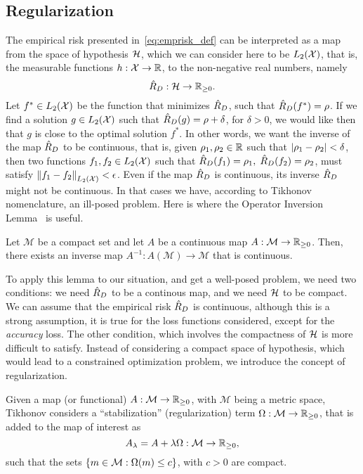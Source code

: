 \subsection{Regularization}
The empirical risk presented in~\eqref{eq:emprisk_def} can be interpreted as a map from the space of hypothesis $\mathcal{H}$, which we can consider here to be $L_2(\mathcal{X})$, that is, the measurable functions $h: \mathcal{X} \to \mathbb{R}$, to the non-negative real numbers, namely
$$ \hat{R}_{D}: \mathcal{H} \to \mathbb{R}_{\geq 0} .$$
%
Let $f^* \in L_2(\mathcal{X})$ be the function that minimizes $\hat{R}_{D}$, such that $\hat{R}_{D}(f^*) = \rho$. If we find a solution $g \in L_2(\mathcal{X})$ such that $\hat{R}_{D}(g) = \rho + \delta$, for $\delta > 0$, we would like then that $g$ is close to the optimal solution $f^*$.
%
In other words, we want the inverse of the map $\hat{R}_{D}$ to be continuous, that is, given $\rho_1, \rho_2 \in \mathbb{R}$ such that $\left|\rho_1 - \rho_2\right| < \delta$, then two functions $f_1, f_2 \in L_2(\mathcal{X})$ such that $\hat{R}_{D}(f_1) = \rho_1, \; \hat{R}_{D}(f_2) = \rho_2$, must satisfy $\left\lVert f_1 - f_2\right\rVert_{L_2(\mathcal{X})} < \epsilon$.
%
Even if the map $\hat{R}_{D}$ is continuous, its inverse $\hat{R}_{D}$ might not be continuous. In that cases we have, according to Tikhonov nomenclature, an ill-posed problem.
%
Here is where the Operator Inversion Lemma~\citep{riesz2012functional} is useful.
\begin{lemma}
    Let $\mathcal{M}$ be a compact set and let $A$ be a continuous map $A: \mathcal{M} \to \mathbb{R}_{\geq 0}$. Then, there exists an inverse map $A^{-1}: A(\mathcal{M}) \to \mathcal{M}$ that is continuous.
\end{lemma}
%
To apply this lemma to our situation, and get a well-posed problem, we need two conditions: we need $\hat{R}_{D}$ to be a continous map, and we need $\mathcal{H}$ to be compact.
%
We can assume that the empirical risk $\hat{R}_{D}$ is continuous, although this is a strong assumption, it is true for the loss functions considered, except for the \emph{accuracy} loss.
%
The other condition, which involves the compactness of $\mathcal{H}$ is more difficult to satisfy. Instead of considering a compact space of hypothesis, which would lead to a constrained optimization problem, we introduce the concept of regularization.

%
Given a map (or functional) $A: \mathcal{M} \to \mathbb{R}_{\geq 0}$, with $\mathcal{M}$ being a metric space,
Tikhonov considers a ``stabilization'' (regularization) term $\Omega: \mathcal{M} \to \mathbb{R}_{\geq 0}$, that is added to the map of interest as 
\begin{equation}
    \nonumber
    A_\lambda = A + \lambda \Omega: \mathcal{M} \to \mathbb{R}_{\geq 0} ,
\end{equation}
such that the sets $\left\{m \in \mathcal{M}: \Omega(m) \leq c\right\}$, with $c > 0$ are compact.

